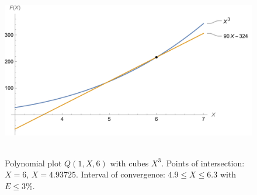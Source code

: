 ﻿\begin{figure}[H]
    \centering
    \includegraphics[width=1\textwidth]{sections/images/02_plots_polynomial_q1_n6_with_cubes}
    ~\caption{Polynomial plot $Q(1, X, 6)$ with cubes $X^3$.
    Points of intersection: $X=6$, $X=4.93725$.
    Interval of convergence: $4.9 \leq X \leq 6.3$ with $E \leq 3\%$.
    }\label{fig:figure8}
\end{figure}
